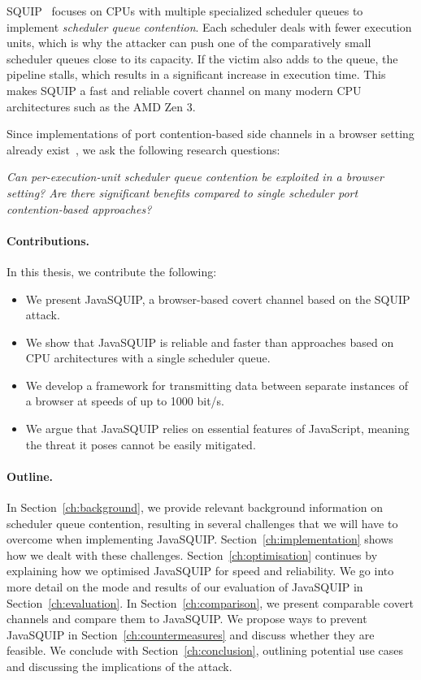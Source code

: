 \documentclass[11pt,
  titlepage=false,
  parskip=half,      %
]{scrreprt}
\begin{document}
SQUIP~\cite{squip} focuses on CPUs with multiple specialized scheduler queues to implement \textit{scheduler queue contention}.
Each scheduler deals with fewer execution units, which is why the attacker can push one of the comparatively small scheduler queues close to its capacity.
If the victim also adds to the queue, the pipeline stalls, which results in a significant increase in execution time.
This makes SQUIP a fast and reliable covert channel on many modern CPU architectures such as the AMD Zen 3.~\cite{squip}

Since implementations of port contention-based side channels in a browser setting already exist~\cite{Rokicki2022webport}, we ask the following research questions:

\textit{
    Can per-execution-unit scheduler queue contention be exploited in a browser setting?
    Are there significant benefits compared to single scheduler port contention-based approaches?
}

\pagebreak
\paragraph{Contributions.}
In this thesis, we contribute the following:
\begin{itemize}
    \item We present JavaSQUIP, a browser-based covert channel based on the SQUIP~\cite{squip} attack.
    \item We show that JavaSQUIP is reliable and faster than approaches based on CPU architectures with a single scheduler queue.
    \item We develop a framework for transmitting data between separate instances of a browser at speeds of up to 1000 bit/s.
    \item We argue that JavaSQUIP relies on essential features of JavaScript, meaning the threat it poses cannot be easily mitigated.
\end{itemize}

\paragraph{Outline.}
In Section~\ref{ch:background}, we provide relevant background information on scheduler queue contention,
resulting in several challenges that we will have to overcome when implementing JavaSQUIP.
Section~\ref{ch:implementation} shows how we dealt with these challenges.
Section~\ref{ch:optimisation} continues by explaining how we optimised JavaSQUIP for speed and reliability.
We go into more detail on the mode and results of our evaluation of JavaSQUIP in Section~\ref{ch:evaluation}.
In Section~\ref{ch:comparison}, we present comparable covert channels and compare them to JavaSQUIP.
We propose ways to prevent JavaSQUIP in Section~\ref{ch:countermeasures} and discuss whether they are feasible.
We conclude with Section~\ref{ch:conclusion}, outlining potential use cases and discussing the implications of the attack.
\end{document}
